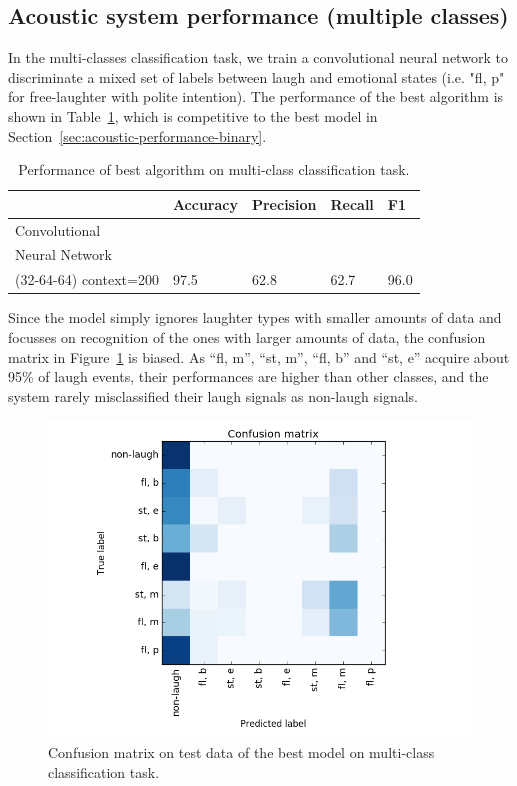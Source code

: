 \documentclass[10pt,journal,compsoc]{IEEEtran}
\begin{document}
\subsection{Acoustic system performance (multiple classes)}
\label{sec:acoustic-performance-multi}

In the multi-classes classification task, we train a convolutional neural network to discriminate a mixed set of labels between laugh and emotional states (i.e. "fl, p" for free-laughter with polite intention).  The performance of the best algorithm is shown in Table~\ref{tab:performance-multi}, which is competitive to the best model in Section~\ref{sec:acoustic-performance-binary}.

\begin{table}[htb]
\caption{Performance of best algorithm on multi-class classification task.}
\label{tab:performance-multi}
\centering
\begin{tabular}{| p{2.8cm} | p{1.1cm} | p{1.1cm}  | p{1.1cm}  | p{0.5cm}  |}
\hline
 & Accuracy & Precision & Recall & F1 \\
\hline
Convolutional & & & & \\
Neural Network & & & & \\
(32-64-64) context=200 & 97.5 & 62.8 & 62.7 & 96.0 \\
\hline
\end{tabular}
\end{table}

Since the model simply ignores laughter types with smaller amounts of data and focusses on recognition of the ones with larger amounts of data, the confusion matrix in Figure~\ref{fig:confusion-matrix-multi} is biased. As ``fl, m'', ``st, m'', ``fl, b'' and ``st, e'' acquire about 95\% of laugh events, their performances are higher than other classes, and the system rarely misclassified their laugh signals as non-laugh signals.

\begin{figure}[htb]
\centering
\includegraphics[width=1\linewidth]{images/ConfusionMatrix-Multi.png}
\caption{Confusion matrix on test data of the best model on multi-class classification task.}
\label{fig:confusion-matrix-multi}
\end{figure}
\end{document}
